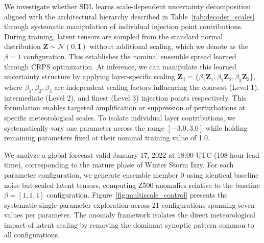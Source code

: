 \documentclass[11pt]{article}
\begin{document}
We investigate whether SDL learns scale-dependent uncertainty decomposition aligned with the architectural hierarchy described in Table~\ref{tab:decoder_scales} through systematic manipulation of individual injection point contributions. During training, latent tensors are sampled from the standard normal distribution $\mathbf{Z} \sim \mathcal{N}(0, \mathbf{I})$ without additional scaling, which we denote as the $\beta = 1$ configuration. This establishes the nominal ensemble spread learned through CRPS optimization. At inference, we can manipulate this learned uncertainty structure by applying layer-specific scaling $\mathbf{Z}_\beta = \{\beta_1\mathbf{Z}_1, \beta_2\mathbf{Z}_2, \beta_3\mathbf{Z}_3\}$, where $\beta_1, \beta_2, \beta_3$ are independent scaling factors influencing the coarsest (Level 1), intermediate (Level 2), and finest (Level 3) injection points respectively. This formulation enables targeted amplification or suppression of perturbations at specific meteorological scales. To isolate individual layer contributions, we systematically vary one parameter across the range $[-3.0, 3.0]$ while holding remaining parameters fixed at their nominal training value of 1.0.


We analyze a global forecast valid January 17, 2022 at 18:00 UTC (108-hour lead time), corresponding to the mature phase of Winter Storm Izzy. For each parameter configuration, we generate ensemble member 0 using identical baseline noise but scaled latent tensors, computing Z500 anomalies relative to the baseline $\beta=[1,1,1]$ configuration. Figure~\ref{fig:multiscale_control} presents the systematic single-parameter exploration across 21 configurations spanning seven values per parameter. The anomaly framework isolates the direct meteorological impact of latent scaling by removing the dominant synoptic pattern common to all configurations.
\end{document}
